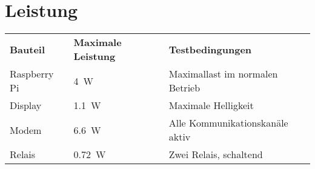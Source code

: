 \documentclass[10pt,a4paper,landscape]{article}
\begin{document}
	\section{Leistung}
	\begin{tabular}{lll}
		\textbf{Bauteil} & \textbf{Maximale Leistung} & \textbf{Testbedingungen} \\ 
		Raspberry Pi & \SI{4}{W} & Maximallast im normalen Betrieb\cite{ref:raspipower} \\ 
		Display & \SI{1.1}{W} & Maximale Helligkeit\cite{datasheet:display} \\ 
		Modem & \SI{6.6}{W} & Alle Kommunikationskanäle aktiv \cite{ref:modemrefdesign} \\ 
		Relais & \SI{0.72}{W} & Zwei Relais, schaltend \cite{datasheet:finder36relais} \\
	\end{tabular} 
	
\end{document}
